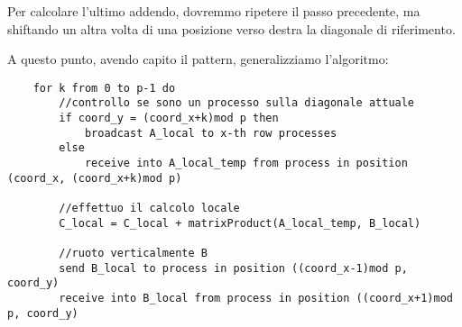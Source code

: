 Per calcolare l'ultimo addendo, dovremmo ripetere il passo precedente, ma shiftando un altra volta di una posizione verso destra la diagonale di riferimento.

A questo punto, avendo capito il pattern, generalizziamo l'algoritmo:
\begin{lstlisting}
    for k from 0 to p-1 do
        //controllo se sono un processo sulla diagonale attuale
        if coord_y = (coord_x+k)mod p then
            broadcast A_local to x-th row processes
        else
            receive into A_local_temp from process in position (coord_x, (coord_x+k)mod p)

        //effettuo il calcolo locale
        C_local = C_local + matrixProduct(A_local_temp, B_local)

        //ruoto verticalmente B
        send B_local to process in position ((coord_x-1)mod p, coord_y)
        receive into B_local from process in position ((coord_x+1)mod p, coord_y)
\end{lstlisting}